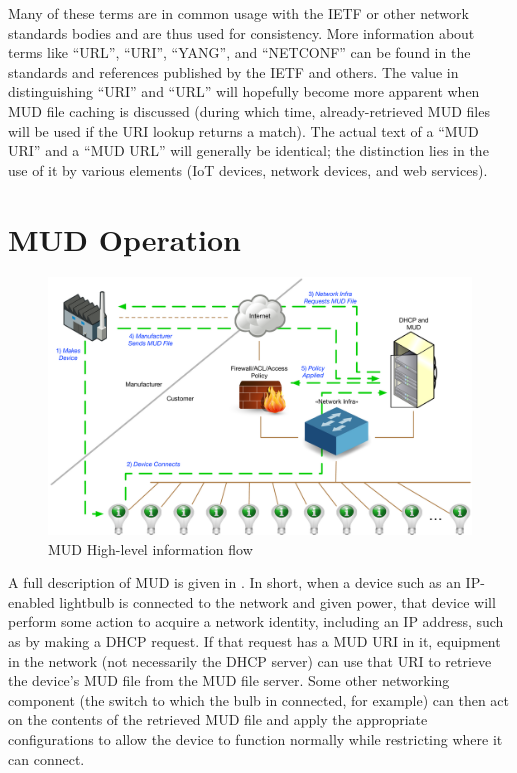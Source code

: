 \documentclass[conference]{IEEEtran}
\begin{document}
Many of these terms are in common usage with the IETF or other network
standards bodies and are thus used for consistency.  More information
about terms like ``URL'', ``URI'', ``YANG'', and ``NETCONF'' can be
found in the standards and references published by the IETF and
others.  The value in distinguishing ``URI'' and ``URL'' will
hopefully become more apparent when MUD file caching is discussed
(during which time, already-retrieved MUD files will be used if the
URI lookup returns a match).  The actual text of a ``MUD URI'' and a
``MUD URL'' will generally be identical; the distinction lies in the
use of it by various elements (IoT devices, network devices, and web
services).

\section{MUD Operation}
\begin{figure}
  \begin{center}
    \includegraphics[width=\textwidth]{Graphics/MUDNetworkFlow}
    \caption{MUD High-level information flow}
    \label{fig:MUDNetwork}
  \end{center}
\end{figure}
A full description of MUD is given in \cite{I-D:ietf-opsawg-mud}.  In
short, when a device such as an IP-enabled lightbulb is connected to
the network and given power, that device will perform some action to
acquire a network identity, including an IP address, such as by making
a DHCP request.  If that request has a MUD URI in it, equipment in the
network (not necessarily the DHCP server) can use that URI to retrieve
the device's MUD file from the MUD file server.  Some other networking
component (the switch to which the bulb in connected, for example) can
then act on the contents of the retrieved MUD file and apply the
appropriate configurations to allow the device to function normally
while restricting where it can connect.
\end{document}
